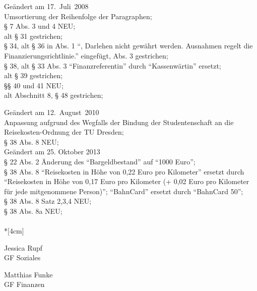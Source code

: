 Geändert am 17.~Juli~2008\\
Umsortierung der Reihenfolge der Paragraphen;\\
§ 7 Abs. 3 und 4 NEU;\\
alt § 31 gestrichen;\\
§ 34, alt § 36 in Abs. 1 "`, Darlehen nicht gewährt werden. Ausnahmen regelt die Finanzierungsrichtlinie."' eingefügt, Abs. 3 gestrichen;\\
§ 38, alt § 33 Abs. 3 "`Finanzreferentin"' durch "`Kassenwärtin"' ersetzt;\\
alt § 39 gestrichen;\\
§§ 40 und 41 NEU;\\
alt Abschnitt 8, § 48 gestrichen;

Geändert am 12.~August~2010\\
Anpassung aufgrund des Wegfalls der Bindung der Studentenschaft an die Reisekosten-Ordnung der TU Dresden;\\
§ 38 Abs. 8 NEU;\\


Geändert am 25. Oktober 2013\\
§ 22 Abs. 2 Änderung des "`Bargeldbestand"' auf "`1000 Euro"';\\
§ 38 Abs. 8 "`Reisekosten in Höhe von 0,22 Euro pro Kilometer"' ersetzt durch "`Reisekosten in Höhe von 0,17 Euro pro Kilometer (+ 0,02 Euro pro Kilometer für jede mitgenommene Person)"'; "`BahnCard"' ersetzt durch "`BahnCard 50"';\\
§ 38 Abs. 8 Satz 2,3,4 NEU;\\
§ 38 Abs. 8a NEU;\\

\normalsize
~\\*[4cm]
\begin{center}
\hspace*{\fill}
\parbox{7cm}{Jessica Rupf\\GF Soziales}
\hfill\parbox{7cm}{Matthias Funke\\GF Finanzen}
\hspace*{\fill}
\end{center}
